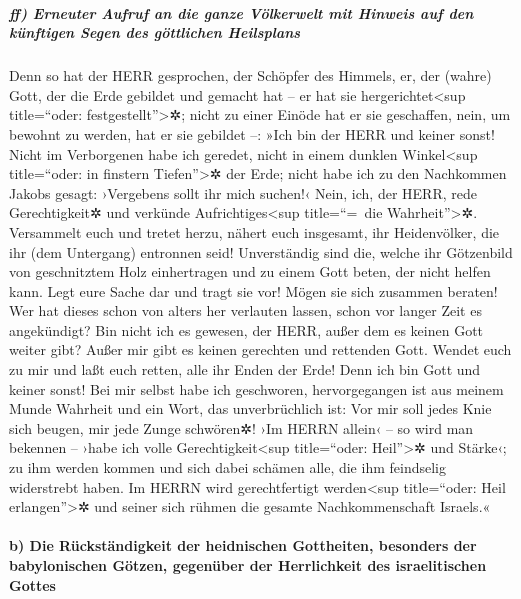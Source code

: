 \hypertarget{ff-erneuter-aufruf-an-die-ganze-vuxf6lkerwelt-mit-hinweis-auf-den-kuxfcnftigen-segen-des-guxf6ttlichen-heilsplans}{%
\subparagraph{ff) Erneuter Aufruf an die ganze Völkerwelt mit Hinweis
auf den künftigen Segen des göttlichen
Heilsplans}\label{ff-erneuter-aufruf-an-die-ganze-vuxf6lkerwelt-mit-hinweis-auf-den-kuxfcnftigen-segen-des-guxf6ttlichen-heilsplans}}

Denn so hat der HERR gesprochen, der Schöpfer des
Himmels, er, der (wahre) Gott, der die Erde gebildet und gemacht hat --
er hat sie hergerichtet\textless sup title=``oder:
festgestellt''\textgreater✲; nicht zu einer Einöde hat er sie
geschaffen, nein, um bewohnt zu werden, hat er sie gebildet --: »Ich bin
der HERR und keiner sonst! Nicht im Verborgenen habe ich
geredet, nicht in einem dunklen Winkel\textless sup title=``oder: in
finstern Tiefen''\textgreater✲ der Erde; nicht habe ich zu den
Nachkommen Jakobs gesagt: ›Vergebens sollt ihr mich suchen!‹ Nein, ich,
der HERR, rede Gerechtigkeit✲ und verkünde Aufrichtiges\textless sup
title=``=~die Wahrheit''\textgreater✲. Versammelt euch
und tretet herzu, nähert euch insgesamt, ihr Heidenvölker, die ihr (dem
Untergang) entronnen seid! Unverständig sind die, welche ihr Götzenbild
von geschnitztem Holz einhertragen und zu einem Gott beten, der nicht
helfen kann. Legt eure Sache dar und tragt sie vor! Mögen
sie sich zusammen beraten! Wer hat dieses schon von alters her verlauten
lassen, schon vor langer Zeit es angekündigt? Bin nicht ich es gewesen,
der HERR, außer dem es keinen Gott weiter gibt? Außer mir gibt es keinen
gerechten und rettenden Gott. Wendet euch zu mir und laßt
euch retten, alle ihr Enden der Erde! Denn ich bin Gott und keiner
sonst! Bei mir selbst habe ich geschworen, hervorgegangen
ist aus meinem Munde Wahrheit und ein Wort, das unverbrüchlich ist: Vor
mir soll jedes Knie sich beugen, mir jede Zunge schwören✲!
›Im HERRN allein‹ -- so wird man bekennen -- ›habe ich
volle Gerechtigkeit\textless sup title=``oder: Heil''\textgreater✲ und
Stärke‹; zu ihm werden kommen und sich dabei schämen alle, die ihm
feindselig widerstrebt haben. Im HERRN wird
gerechtfertigt werden\textless sup title=``oder: Heil
erlangen''\textgreater✲ und seiner sich rühmen die gesamte
Nachkommenschaft Israels.«

\hypertarget{b-die-ruxfcckstuxe4ndigkeit-der-heidnischen-gottheiten-besonders-der-babylonischen-guxf6tzen-gegenuxfcber-der-herrlichkeit-des-israelitischen-gottes}{%
\paragraph{b) Die Rückständigkeit der heidnischen Gottheiten, besonders
der babylonischen Götzen, gegenüber der Herrlichkeit des israelitischen
Gottes}\label{b-die-ruxfcckstuxe4ndigkeit-der-heidnischen-gottheiten-besonders-der-babylonischen-guxf6tzen-gegenuxfcber-der-herrlichkeit-des-israelitischen-gottes}}

